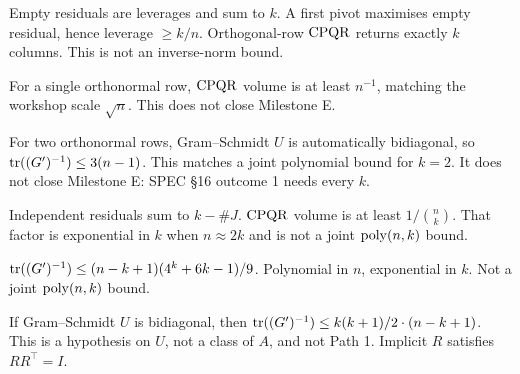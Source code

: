 \begin{theorem}
\label{thm:e-structural}
\leanok
{}
Empty residuals are leverages and sum to $k$. A first pivot maximises
empty residual, hence leverage $\ge k/n$. Orthogonal-row $\mathrm{CPQR}$ returns
exactly $k$ columns. This is not an inverse-norm bound.
\end{theorem}

\begin{theorem}[$k=1$ volume]
\label{thm:e-k1}
\leanok
{}
For a single orthonormal row, $\mathrm{CPQR}$ volume is at least $n^{-1}$, matching
the workshop scale $\sqrt{n}$. This does not close Milestone E.
\end{theorem}

\begin{theorem}[$k=2$ inverse-trace]
\label{thm:e-k2}
\leanok
{}
For two orthonormal rows, Gram--Schmidt $U$ is automatically bidiagonal, so
$\operatorname{tr}((G')^{-1})\le 3(n-1)$. This matches a joint polynomial bound for
$k=2$. It does not close Milestone E: SPEC §16 outcome 1 needs every $k$.
\end{theorem}

\begin{theorem}
\label{thm:e-residual}
\leanok
{}
Independent residuals sum to $k-\#J$. $\mathrm{CPQR}$ volume is at least
$1/\binom{n}{k}$. That factor is exponential in $k$ when $n\approx 2k$ and
is not a joint $\mathrm{poly}(n,k)$ bound.
\end{theorem}

\begin{theorem}
\label{thm:e-triangular}
\leanok
{}
$\operatorname{tr}((G')^{-1})\le (n-k+1)(4^k+6k-1)/9$. Polynomial in $n$, exponential in
$k$. Not a joint $\mathrm{poly}(n,k)$ bound.
\end{theorem}

\begin{theorem}
\label{thm:e-bidiagonal}
\leanok
{}
If Gram--Schmidt $U$ is bidiagonal, then
$\operatorname{tr}((G')^{-1})\le k(k+1)/2\cdot(n-k+1)$. This is a hypothesis on $U$, not a
class of $A$, and not Path 1. Implicit $R$ satisfies $RR^\top=I$.
\end{theorem}

